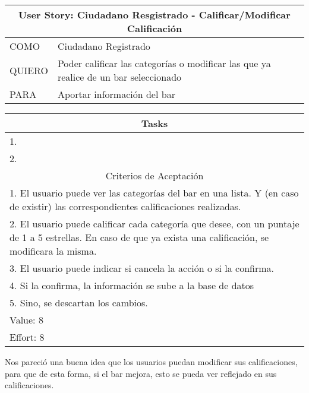     \begin{table}[H]
        \centering
        \begin{tabular}{| p{1.5cm}| p{10.2cm} |}
            \hline
            \multicolumn{2}{|c|}{User Story: Ciudadano Resgistrado - Calificar/Modificar Calificación} \\
            \hline
            COMO & Ciudadano Registrado \\ \hline
            QUIERO & Poder calificar las categorías o modificar las que ya realice de un bar seleccionado \\ \hline
            PARA & Aportar información del bar \\ \hline
            \hline
        \end{tabular}
        \begin{tabular}{| p{12.118cm} |}
            \multicolumn{1}{|c|}{Tasks} \\
            \hline
            1. \\ \hline
            2. \\ \hline
            \hline
            \multicolumn{1}{|c|}{Criterios de Aceptación} \\
            \hline
            1. El usuario puede ver las categorías del bar en una lista. Y (en caso de existir) las correspondientes calificaciones realizadas. \\ \hline
            2. El usuario puede calificar cada categoría que desee, con un puntaje de 1 a 5 estrellas. En caso de que ya exista una calificación, se modificara la misma. \\ \hline
            3. El usuario puede indicar si cancela la acción o si la confirma. \\ \hline
            4. Si la confirma, la información se sube a la base de datos  \\ \hline
            5. Sino, se descartan los cambios. \\ \hline
            Value: 8 \\ \hline
            Effort: 8 \\ \hline
        \end{tabular}
    \end{table}
    
     Nos pareció una buena idea que los usuarios puedan modificar sus calificaciones, para que de esta forma, si el bar mejora, esto se pueda ver reflejado en sus calificaciones. \\
    
